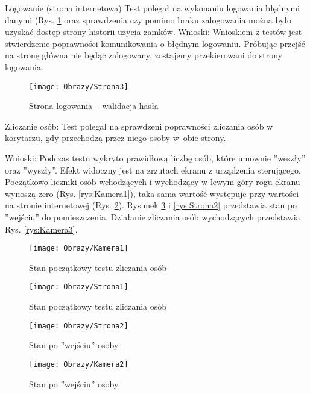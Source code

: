 \documentclass[twoside,10pt]{article}
\begin{document}
\begin{enumerate*}
\item Logowanie (strona internetowa) \newline
Test polegał na wykonaniu logowania błędnymi danymi (Rys. \ref{rys:Strona3} oraz sprawdzenia czy pomimo braku zalogowania można było uzyskać dostęp strony historii użycia zamków. \newline
Wnioski: Wnioskiem z testów jest stwierdzenie poprawności komunikowania o błędnym logowaniu. Próbując przejść na stronę główna nie będąc zalogowany, zostajemy przekierowani do strony logowania.
\begin{figure}[ht!]
\centering
\texttt{[image: Obrazy/Strona3]}
\caption{Strona logowania -- walidacja hasła}
\label{rys:Strona3}
\end{figure}

\item Zliczanie osób: \newline
Test polegał na sprawdzeni poprawności zliczania osób w korytarzu, gdy przechodzą przez niego osoby w~obie strony.

Wnioski: Podczas testu wykryto prawidłową liczbę osób, które umownie ''weszły'' oraz ''wyszły''. Efekt widoczny jest na zrzutach ekranu z urządzenia sterującego. Początkowo liczniki osób wchodzących i wychodzący w lewym góry rogu ekranu wynoszą zero (Rys. \ref{rys:Kamera1}), taka sama wartość występuje przy wartości na stronie internetowej (Rys. \ref{rys:Strona1}). Rysunek \ref{rys:Kamera2} i \ref{rys:Strona2} przedstawia stan po ''wejściu'' do pomieszczenia. Działanie zliczania osób wychodzących przedstawia Rys. \ref{rys:Kamera3}.

\begin{figure}[ht!]
\vspace{-0.35cm}
\begin{minipage}{0.3\textwidth}
\texttt{[image: Obrazy/Kamera1]}
\caption{Stan początkowy testu zliczania osób }
\label{rys:Kamera1}
\end{minipage}
\hspace{0.01\textwidth}
\begin{minipage}{0.69\textwidth}
\vspace{-1cm}
\texttt{[image: Obrazy/Strona1]}
\caption{Stan początkowy testu zliczania osób}
\label{rys:Strona1}
\end{minipage}
\end{figure}

\begin{figure}[ht!]
\vspace{-1.5cm}
\begin{minipage}{0.69\textwidth}
\texttt{[image: Obrazy/Strona2]}
\caption{Stan po ''wejściu'' osoby }
\label{rys:Strona2}
\end{minipage}
\hspace{0.01\textwidth}
\begin{minipage}{0.3\textwidth}
\texttt{[image: Obrazy/Kamera2]}
\caption{Stan po ''wejściu'' osoby}
\label{rys:Kamera2}
\end{minipage}
\end{figure}


\end{enumerate*}
\end{document}

